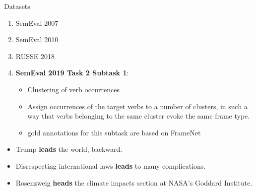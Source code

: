 \begin{frame}{ Datasets }
\vspace{-10pt}

\begin{enumerate}
	\item SemEval 2007 
	\item SemEval 2010
	\item RUSSE 2018
	\item \textbf{SemEval 2019 Task 2 Subtask 1}:  
	\begin{itemize}
		\item Clustering of verb occurrences
		\item Assign occurrences of the target verbs to a number of clusters, in such a way that verbs belonging to the same cluster evoke the same frame type.
		\item gold annotations for this subtask are based on FrameNet
	\end{itemize}
	
\end{enumerate}

\pause 
\vspace{5pt}

\begin{itemize}
\footnotesize
\item Trump \textbf{leads} the world, backward.
\item Disrespecting international laws \textbf{leads} to many complications.
\item Rosenzweig \textbf{heads} the climate impacts section at NASA's Goddard Institute.
\end{itemize}

\end{frame}



